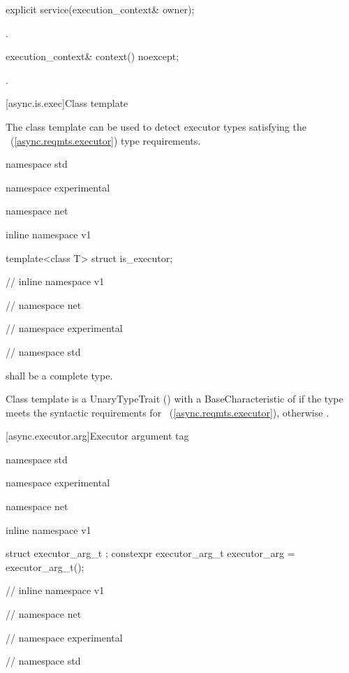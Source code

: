 %
\begin{itemdecl}
explicit service(execution_context& owner);
\end{itemdecl}

\begin{itemdescr}
\pnum
\postconditions {}.
\end{itemdescr}

%
\begin{itemdecl}
execution_context& context() noexcept;
\end{itemdecl}

\begin{itemdescr}
\pnum
\returns {}.
\end{itemdescr}



[async.is.exec]{Class template }

%
\pnum
The class template  can be used to detect executor types satisfying the ~(\ref{async.reqmts.executor}) type requirements.

\begin{codeblock}
namespace std {
namespace experimental {
namespace net {
inline namespace v1 {

  template<class T> struct is_executor;

} // inline namespace v1
} // namespace net
} // namespace experimental
} // namespace std
\end{codeblock}

\pnum
{} shall be a complete type.

\pnum
Class template  is a UnaryTypeTrait () with a BaseCharacteristic of  if the type  meets the syntactic requirements for ~(\ref{async.reqmts.executor}), otherwise .



[async.executor.arg]{Executor argument tag}

%
%
\begin{codeblock}
namespace std {
namespace experimental {
namespace net {
inline namespace v1 {

  struct executor_arg_t { };
  constexpr executor_arg_t executor_arg = executor_arg_t();

} // inline namespace v1
} // namespace net
} // namespace experimental
} // namespace std
\end{codeblock}

